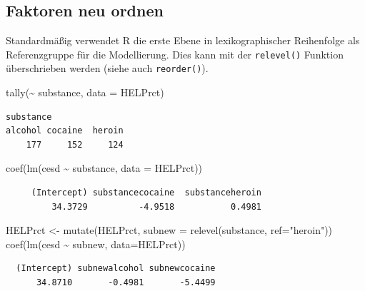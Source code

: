 \documentclass[
  ngerman,
]{scrbook}
\newenvironment{Shaded}{\begin{snugshade}}{\end{snugshade}}
\newcommand{\AttributeTok}[1]{\textcolor[rgb]{0.77,0.63,0.00}{#1}}
\newcommand{\FunctionTok}[1]{\textcolor[rgb]{0.00,0.00,0.00}{#1}}
\newcommand{\NormalTok}[1]{#1}
\newcommand{\OtherTok}[1]{\textcolor[rgb]{0.56,0.35,0.01}{#1}}
\newcommand{\SpecialCharTok}[1]{\textcolor[rgb]{0.00,0.00,0.00}{#1}}
\newcommand{\StringTok}[1]{\textcolor[rgb]{0.31,0.60,0.02}{#1}}
\begin{document}
\hypertarget{faktoren-neu-ordnen}{%
\subsection{Faktoren neu ordnen}\label{faktoren-neu-ordnen}}

Standardmäßig verwendet \textsf{R} die erste Ebene in lexikographischer Reihenfolge als Referenzgruppe für die Modellierung. Dies kann mit der \texttt{relevel()} Funktion überschrieben werden (siehe auch \texttt{reorder()}).

\begin{Shaded}
\begin{Highlighting}[]
 \FunctionTok{tally}\NormalTok{(}\SpecialCharTok{\textasciitilde{}}\NormalTok{ substance, }\AttributeTok{data =}\NormalTok{ HELPrct)}
\end{Highlighting}
\end{Shaded}

\begin{verbatim}
substance
alcohol cocaine  heroin 
    177     152     124 
\end{verbatim}

\begin{Shaded}
\begin{Highlighting}[]
 \FunctionTok{coef}\NormalTok{(}\FunctionTok{lm}\NormalTok{(cesd }\SpecialCharTok{\textasciitilde{}}\NormalTok{ substance, }\AttributeTok{data =}\NormalTok{ HELPrct))}
\end{Highlighting}
\end{Shaded}

\begin{verbatim}
     (Intercept) substancecocaine  substanceheroin 
         34.3729          -4.9518           0.4981 
\end{verbatim}

\begin{Shaded}
\begin{Highlighting}[]
\NormalTok{HELPrct }\OtherTok{\textless{}{-}} \FunctionTok{mutate}\NormalTok{(HELPrct, }\AttributeTok{subnew =} \FunctionTok{relevel}\NormalTok{(substance, }\AttributeTok{ref=}\StringTok{"heroin"}\NormalTok{))}
\FunctionTok{coef}\NormalTok{(}\FunctionTok{lm}\NormalTok{(cesd }\SpecialCharTok{\textasciitilde{}}\NormalTok{ subnew, }\AttributeTok{data=}\NormalTok{HELPrct))}
\end{Highlighting}
\end{Shaded}

\begin{verbatim}
  (Intercept) subnewalcohol subnewcocaine 
      34.8710       -0.4981       -5.4499 
\end{verbatim}
\end{document}

